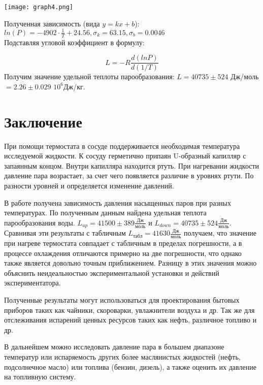 \documentclass[a4paper,10pt]{article} %
\begin{document}
\begin{center}
	\texttt{[image: graph4.png]}
\end{center}


Полученная зависимость (вида $y = kx + b$): $ln(P) = -4902\cdot \frac{1}{T} + 24.56, \sigma_k = 63.15, \sigma_b = 0.0046$\\


Подставляя угловой коэффициент в формулу:

$$L = -R\frac{d(lnP)}{d(1/T)}$$
Получим значение удельной теплоты парообразования: $L = 40735 \pm 524$ Дж/моль $= 2.26 \pm 0.029$ $10^6$Дж/кг.\\




\section{Заключение}

	При помощи термостата в  сосуде поддерживается необходимая температура исследуемой жидкости. К сосуду герметично припаян U-образный капилляр с запаянным концом. Внутри капилляра находится ртуть. При нагревании жидкости давление пара возрастает, за счет чего появляется различие в уровнях ртути. По разности уровней и определяется изменение давлений. 

	В работе получена зависимость давления насыщенных паров при разных температурах. По полученным данным найдена удельная теплота парообразования воды. $L_{up} = 41500 \pm 389 \frac{Дж}{моль}$ и $L_{down} = 40735 \pm 524 \frac{Дж}{моль}$. Сравнивая эти результаты с табличным $L_{табл} = 41630 \frac{Дж}{моль}$ получаем, что значение при нагреве термостата совпадает с табличным в пределах погрешности, а в процессе охлаждения отличаются примерно на две погрешности, что однако также является довольно точным приближением. Разницу в этих значения можно объяснить неидеальностью экспериментальной установки и действий экспериментатора.

	Полученные результаты могут использоваться для проектирования бытовых приборов таких как чайники, скороварки, увлажнители воздуха и др. Так же для отслеживания испарений ценных ресурсов таких как нефть, различное топливо и др. 

	В дальнейшем можно исследовать давление пара в большем диапазоне температур или испаряемость других более маслянистых жидкостей (нефть,   подсолнечное масло) или топлива (бензин, дизель), а также оценить их давление на топливную систему.
\end{document}
